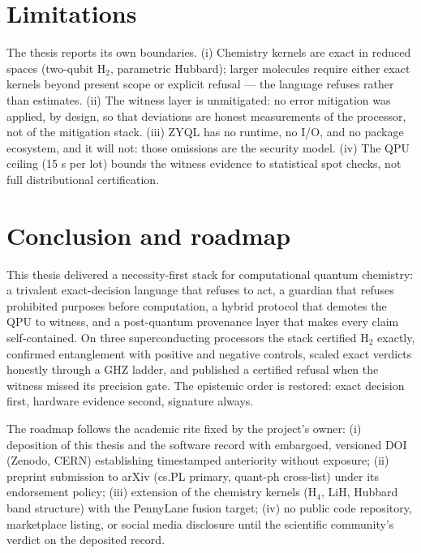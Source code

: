\documentclass[11pt,a4paper]{report}
\begin{document}
\chapter{Limitations}
\label{ch:limits}

The thesis reports its own boundaries. (i) Chemistry kernels are exact
in reduced spaces (two-qubit H$_2$, parametric Hubbard); larger molecules
require either exact kernels beyond present scope or explicit refusal ---
the language refuses rather than estimates. (ii) The witness layer is
unmitigated: no error mitigation was applied, by design, so that
deviations are honest measurements of the processor, not of the
mitigation stack. (iii) ZYQL has no runtime, no I/O, and no package
ecosystem, and it will not: those omissions are the security model.
(iv) The QPU ceiling (15 s per lot) bounds the witness evidence to
statistical spot checks, not full distributional certification.

\chapter{Conclusion and roadmap}
\label{ch:conclusion}

This thesis delivered a necessity-first stack for computational quantum
chemistry: a trivalent exact-decision language that refuses to act, a
guardian that refuses prohibited purposes before computation, a hybrid
protocol that demotes the QPU to witness, and a post-quantum provenance
layer that makes every claim self-contained. On three superconducting
processors the stack certified H$_2$ exactly, confirmed entanglement with
positive and negative controls, scaled exact verdicts honestly through a
GHZ ladder, and published a certified refusal when the witness missed its
precision gate. The epistemic order is restored: exact decision first,
hardware evidence second, signature always.

The roadmap follows the academic rite fixed by the project's owner:
(i) deposition of this thesis and the software record with embargoed,
versioned DOI (Zenodo, CERN) establishing timestamped anteriority
without exposure; (ii) preprint submission to arXiv (cs.PL primary,
quant-ph cross-list) under its endorsement policy; (iii) extension of
the chemistry kernels (H$_4$, LiH, Hubbard band structure) with the
PennyLane fusion target; (iv) no public code repository, marketplace
listing, or social media disclosure until the scientific community's
verdict on the deposited record.
\end{document}
